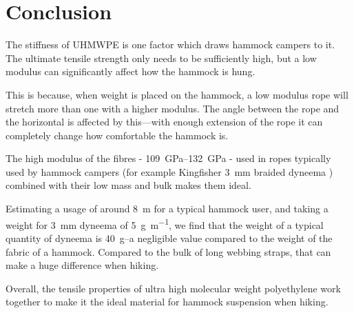 \section{Conclusion}
The stiffness of UHMWPE is one factor which draws hammock campers to it. The ultimate tensile strength only needs to be sufficiently high, but a low modulus can significantly affect how the hammock is hung.

This is because, when weight is placed on the hammock, a low modulus rope will stretch more than one with a higher modulus. The angle between the rope and the horizontal is affected by this---with enough extension of the rope it can completely change how comfortable the hammock is.

The high modulus of the fibres - \SIrange{109}{132}{\giga\pascal}  - used in ropes typically used by hammock campers (for example Kingfisher \SI{3}{\milli\metre} braided dyneema ) combined with their low mass and bulk makes them ideal.

Estimating a usage of around \SI{8}{\metre} for a typical hammock user, and taking a weight for \SI{3}{\milli\metre} dyneema of \SI{5}{\gram\per\metre}, we find that the weight of a typical quantity of dyneema is \SI{40}{\gram}--a negligible value compared to the weight of the fabric of a hammock. Compared to the bulk of long webbing straps, that can make a huge difference when hiking.

Overall, the tensile properties of ultra high molecular weight polyethylene work together to make it the ideal material for hammock suspension when hiking.